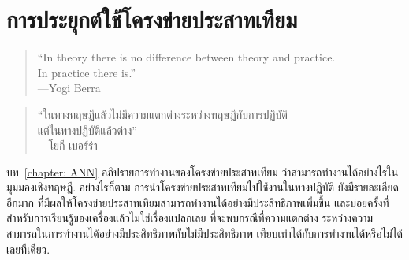 \chapter{การประยุกต์ใช้โครงข่ายประสาทเทียม}
\label{chapter: Applications of ANN}


\begin{verse}
``In theory there is no difference between theory and practice.
\\In practice there is.'' \\
---Yogi Berra
\end{verse}

\begin{verse}
``ในทางทฤษฎีแล้วไม่มีความแตกต่างระหว่างทฤษฎีกับการปฏิบัติ
\\แต่ในทางปฏิบัติแล้วต่าง''\\
---โยกี เบอร์ร่า
\end{verse}




บท~\ref{chapter: ANN} อภิปรายการทำงานของโครงข่ายประสาทเทียม 
ว่าสามารถทำงานได้อย่างไรในมุมมองเชิงทฤษฎี.
อย่างไรก็ตาม การนำโครงข่ายประสาทเทียมไปใช้งานในทางปฏิบัติ ยังมีรายละเอียดอีกมาก ที่มีผลให้โครงข่ายประสาทเทียมสามารถทำงานได้อย่างมีประสิทธิภาพเพิ่มขึ้น
และบ่อยครั้งที่สำหรับการเรียนรู้ของเครื่องแล้วไม่ใช่เรื่องแปลกเลย 
ที่จะพบกรณีที่ความแตกต่าง ระหว่างความสามารถในการทำงานได้อย่างมีประสิทธิภาพกับไม่มีประสิทธิภาพ 
เทียบเท่าได้กับการทำงานได้หรือไม่ได้เลยทีเดียว.

